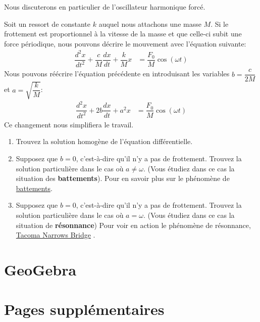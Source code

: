 \documentclass[]{book}
\providecommand{\tightlist}{%
  \setlength{\itemsep}{0pt}\setlength{\parskip}{0pt}}
\theoremstyle{definition}
\theoremstyle{definition}
\theoremstyle{definition}
\theoremstyle{remark}
\let\BeginKnitrBlock\begin \let\EndKnitrBlock\end
\begin{document}
Nous discuterons en particulier de l'oscillateur harmonique forcé.

\BeginKnitrBlock{example}[Oscillateur harmonique forcé]
\protect\hypertarget{exm:unnamed-chunk-92}{}{\label{exm:unnamed-chunk-92}
{} }Soit un ressort de
constante \(k\) auquel nous attachons une masse \(M\). Si le frottement
est proportionnel à la vitesse de la masse et que celle-ci subit une
force périodique, nous pouvons décrire le mouvement avec l'équation
suivante: \begin{align*}
\dfrac{d^2x}{dt^2}+\dfrac{c}{M}\dfrac{dx}{dt}+\dfrac{k}{M}x &= \dfrac{F_0}{M}\cos(\omega t)
\end{align*} Nous pouvons réécrire l'équation précédente en introduisant
les variables \(b=\dfrac{c}{2M}\) et \(a=\sqrt{\dfrac{k}{M}}\):
\begin{align*}
\dfrac{d^2x}{dt^2}+2b\dfrac{dx}{dt}+a^2x &= \dfrac{F_0}{M}\cos(\omega t)
\end{align*} Ce changement nous simplifiera le travail.

\begin{enumerate}
\def\labelenumi{\alph{enumi}.}
\tightlist
\item
  Trouvez la solution homogène de l'équation différentielle.
\item
  Supposez que \(b=0\), c'est-à-dire qu'il n'y a pas de frottement.
  Trouvez la solution particulière dans le cas où \(a\neq \omega\).
  (Vous étudiez dans ce cas la situation des \textbf{battements}). Pour
  en savoir plus sur le phénomène de
  \href{https://fr.wikipedia.org/wiki/Battement_(physique)}{battements}.
\item
  Supposez que \(b=0\), c'est-à-dire qu'il n'y a pas de frottement.
  Trouvez la solution particulière dans le cas où \(a =\omega\). (Vous
  étudiez dans ce cas la situation de \textbf{résonnance}) Pour voir en
  action le phénomène de résonnance,
  \href{https://www.youtube.com/watch?v=j-zczJXSxnw}{Tacoma Narrows
  Bridge} .
\end{enumerate}
\EndKnitrBlock{example}

\hypertarget{geogebra-equations-diff}{%
\section{GeoGebra}\label{geogebra-equations-diff}}

\hypertarget{applet_container}{}

\newpage

\hypertarget{pages-supplementaires-1}{%
\section{Pages supplémentaires}\label{pages-supplementaires-1}}
\end{document}

